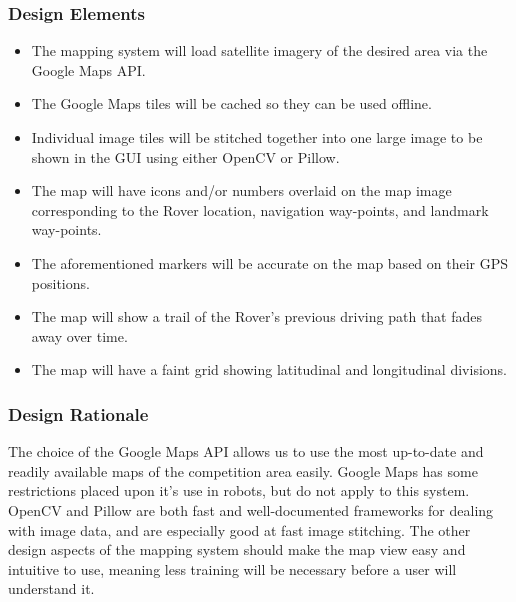 \subsubsection{Design Elements}
\begin{itemize}
\item The mapping system will load satellite imagery of the desired area via the Google Maps API.
\item The Google Maps tiles will be cached so they can be used offline.
\item Individual image tiles will be stitched together into one large image to be shown in the GUI using either OpenCV or Pillow.
\item The map will have icons and/or numbers overlaid on the map image corresponding to the Rover location, navigation way-points, and landmark way-points.
\item The aforementioned markers will be accurate on the map based on their GPS positions.
\item The map will show a trail of the Rover's previous driving path that fades away over time.
\item The map will have a faint grid showing latitudinal and longitudinal divisions.
\end{itemize}

\subsubsection{Design Rationale}
The choice of the Google Maps API allows us to use the most up-to-date and readily available maps of the competition area easily.
Google Maps has some restrictions placed upon it's use in robots, but do not apply to this system.
OpenCV and Pillow are both fast and well-documented frameworks for dealing with image data, and are especially good at fast image stitching.
The other design aspects of the mapping system should make the map view easy and intuitive to use, meaning less training will be necessary before a user will understand it.
